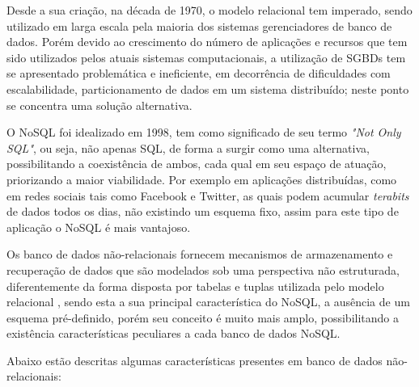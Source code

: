 \documentclass[12pt]{article}
\begin{document}
Desde a sua criação, na década de 1970, o modelo relacional tem imperado, sendo utilizado em larga escala pela maioria dos sistemas gerenciadores de banco de dados. Porém devido ao crescimento do número de aplicações e recursos que tem sido utilizados pelos atuais sistemas computacionais, a utilização de SGBDs tem se apresentado problemática e ineficiente, em decorrência de dificuldades com escalabilidade, particionamento de dados em um sistema distribuído; neste ponto se concentra uma solução alternativa.

O NoSQL foi idealizado em 1998, tem como significado de seu termo \textit{"Not Only SQL"}, ou seja, não apenas SQL, de forma a surgir como uma alternativa, possibilitando a coexistência de ambos, cada qual em seu espaço de atuação, priorizando a maior viabilidade. Por exemplo em aplicações distribuídas, como em redes sociais tais como Facebook e Twitter, as quais podem acumular \textit{terabits} de dados todos os dias, não existindo um esquema fixo, assim para este tipo de aplicação o NoSQL é mais vantajoso.\cite{gueidi:2016} 

Os banco de dados não-relacionais fornecem mecanismos de armazenamento e recuperação de dados que são modelados sob uma perspectiva não estruturada, diferentemente da forma disposta por tabelas e tuplas utilizada pelo modelo relacional \cite{zhaoSchema:2014}, sendo esta a sua principal característica do NoSQL, a ausência de um esquema pré-definido, porém seu conceito é muito mais amplo, possibilitando a existência características peculiares a cada banco de dados NoSQL.

Abaixo estão descritas algumas características presentes em banco de dados não-relacionais:
\end{document}
